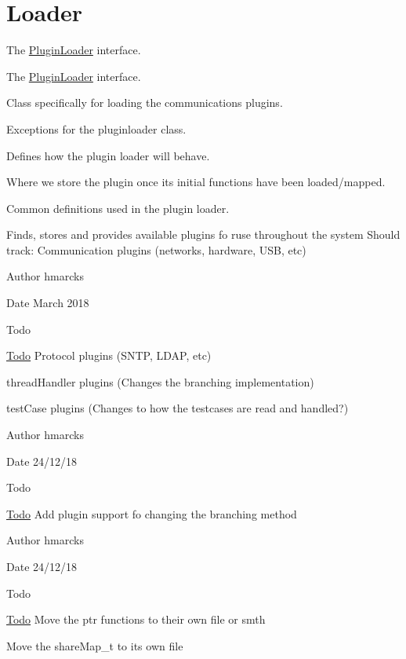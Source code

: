 \hypertarget{group__Plugin}{}\section{Loader}
\label{group__Plugin}


The \mbox{\hyperlink{namespacePluginLoader}{Plugin\+Loader}} interface.  


The \mbox{\hyperlink{namespacePluginLoader}{Plugin\+Loader}} interface. 

Class specifically for loading the communications plugins.

Exceptions for the pluginloader class.

Defines how the plugin loader will behave.

Where we store the plugin once it\textquotesingle{}s initial functions have been loaded/mapped.

Common definitions used in the plugin loader.

Finds, stores and provides available plugins fo ruse throughout the system Should track\+: Communication plugins (networks, hardware, U\+SB, etc)

\begin{DoxyAuthor}{Author}
hmarcks
\end{DoxyAuthor}
\begin{DoxyDate}{Date}
March 2018
\end{DoxyDate}
\begin{DoxyRefDesc}{Todo}
\item[\mbox{\hyperlink{todo__todo000013}{Todo}}]Protocol plugins (S\+N\+TP, L\+D\+AP, etc) 

thread\+Handler plugins (Changes the branching implementation) 

test\+Case plugins (Changes to how the testcases are read and handled?)\end{DoxyRefDesc}


\begin{DoxyAuthor}{Author}
hmarcks
\end{DoxyAuthor}
\begin{DoxyDate}{Date}
24/12/18
\end{DoxyDate}
\begin{DoxyRefDesc}{Todo}
\item[\mbox{\hyperlink{todo__todo000014}{Todo}}]Add plugin support fo changing the branching method \end{DoxyRefDesc}


\begin{DoxyAuthor}{Author}
hmarcks
\end{DoxyAuthor}
\begin{DoxyDate}{Date}
24/12/18
\end{DoxyDate}
\begin{DoxyRefDesc}{Todo}
\item[\mbox{\hyperlink{todo__todo000016}{Todo}}]Move the ptr functions to their own file or smth 

Move the share\+Map\+\_\+t to its own file \end{DoxyRefDesc}


